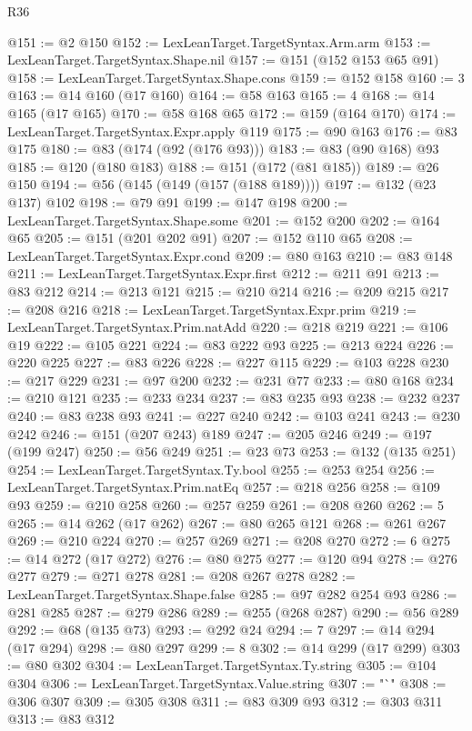 \begin{lexlean}{R36}
\begin{coremodule}
@151 := @2 @150
@152 := LexLeanTarget.TargetSyntax.Arm.arm
@153 := LexLeanTarget.TargetSyntax.Shape.nil
@157 := @151 (@152 @153 @65 @91)
@158 := LexLeanTarget.TargetSyntax.Shape.cons
@159 := @152 @158
@160 := 3
@163 := @14 @160 (@17 @160)
@164 := @58 @163
@165 := 4
@168 := @14 @165 (@17 @165)
@170 := @58 @168 @65
@172 := @159 (@164 @170)
@174 := LexLeanTarget.TargetSyntax.Expr.apply @119
@175 := @90 @163
@176 := @83 @175
@180 := @83 (@174 (@92 (@176 @93)))
@183 := @83 (@90 @168) @93
@185 := @120 (@180 @183)
@188 := @151 (@172 (@81 @185))
@189 := @26 @150
@194 := @56 (@145 (@149 (@157 (@188 @189))))
@197 := @132 (@23 @137) @102
@198 := @79 @91
@199 := @147 @198
@200 := LexLeanTarget.TargetSyntax.Shape.some
@201 := @152 @200
@202 := @164 @65
@205 := @151 (@201 @202 @91)
@207 := @152 @110 @65
@208 := LexLeanTarget.TargetSyntax.Expr.cond
@209 := @80 @163
@210 := @83 @148
@211 := LexLeanTarget.TargetSyntax.Expr.first
@212 := @211 @91
@213 := @83 @212
@214 := @213 @121
@215 := @210 @214
@216 := @209 @215
@217 := @208 @216
@218 := LexLeanTarget.TargetSyntax.Expr.prim
@219 := LexLeanTarget.TargetSyntax.Prim.natAdd
@220 := @218 @219
@221 := @106 @19
@222 := @105 @221
@224 := @83 @222 @93
@225 := @213 @224
@226 := @220 @225
@227 := @83 @226
@228 := @227 @115
@229 := @103 @228
@230 := @217 @229
@231 := @97 @200
@232 := @231 @77
@233 := @80 @168
@234 := @210 @121
@235 := @233 @234
@237 := @83 @235 @93
@238 := @232 @237
@240 := @83 @238 @93
@241 := @227 @240
@242 := @103 @241
@243 := @230 @242
@246 := @151 (@207 @243) @189
@247 := @205 @246
@249 := @197 (@199 @247)
@250 := @56 @249
@251 := @23 @73
@253 := @132 (@135 @251)
@254 := LexLeanTarget.TargetSyntax.Ty.bool
@255 := @253 @254
@256 := LexLeanTarget.TargetSyntax.Prim.natEq
@257 := @218 @256
@258 := @109 @93
@259 := @210 @258
@260 := @257 @259
@261 := @208 @260
@262 := 5
@265 := @14 @262 (@17 @262)
@267 := @80 @265 @121
@268 := @261 @267
@269 := @210 @224
@270 := @257 @269
@271 := @208 @270
@272 := 6
@275 := @14 @272 (@17 @272)
@276 := @80 @275
@277 := @120 @94
@278 := @276 @277
@279 := @271 @278
@281 := @208 @267 @278
@282 := LexLeanTarget.TargetSyntax.Shape.false
@285 := @97 @282 @254 @93
@286 := @281 @285
@287 := @279 @286
@289 := @255 (@268 @287)
@290 := @56 @289
@292 := @68 (@135 @73)
@293 := @292 @24
@294 := 7
@297 := @14 @294 (@17 @294)
@298 := @80 @297
@299 := 8
@302 := @14 @299 (@17 @299)
@303 := @80 @302
@304 := LexLeanTarget.TargetSyntax.Ty.string
@305 := @104 @304
@306 := LexLeanTarget.TargetSyntax.Value.string
@307 := "`"
@308 := @306 @307
@309 := @305 @308
@311 := @83 @309 @93
@312 := @303 @311
@313 := @83 @312

\end{coremodule}
\end{lexlean}
